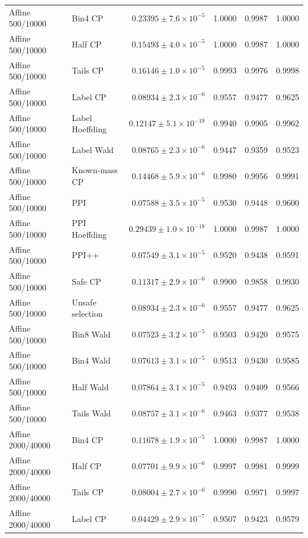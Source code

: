 \begin{longtable}{llrrrr}
Affine 500/10000 & Bin4 CP & $0.23395\pm 7.6\times 10^{-5}$ & 1.0000 & 0.9987 & 1.0000 \\
Affine 500/10000 & Half CP & $0.15493\pm 4.0\times 10^{-5}$ & 1.0000 & 0.9987 & 1.0000 \\
Affine 500/10000 & Tails CP & $0.16146\pm 1.0\times 10^{-5}$ & 0.9993 & 0.9976 & 0.9998 \\
Affine 500/10000 & Label CP & $0.08934\pm 2.3\times 10^{-6}$ & 0.9557 & 0.9477 & 0.9625 \\
Affine 500/10000 & Label Hoeffding & $0.12147\pm 5.1\times 10^{-19}$ & 0.9940 & 0.9905 & 0.9962 \\
Affine 500/10000 & Label Wald & $0.08765\pm 2.3\times 10^{-6}$ & 0.9447 & 0.9359 & 0.9523 \\
Affine 500/10000 & Known-mass CP & $0.14468\pm 5.9\times 10^{-6}$ & 0.9980 & 0.9956 & 0.9991 \\
Affine 500/10000 & PPI & $0.07588\pm 3.5\times 10^{-5}$ & 0.9530 & 0.9448 & 0.9600 \\
Affine 500/10000 & PPI Hoeffding & $0.29439\pm 1.0\times 10^{-18}$ & 1.0000 & 0.9987 & 1.0000 \\
Affine 500/10000 & PPI++ & $0.07549\pm 3.1\times 10^{-5}$ & 0.9520 & 0.9438 & 0.9591 \\
Affine 500/10000 & Safe CP & $0.11317\pm 2.9\times 10^{-6}$ & 0.9900 & 0.9858 & 0.9930 \\
Affine 500/10000 & Unsafe selection & $0.08934\pm 2.3\times 10^{-6}$ & 0.9557 & 0.9477 & 0.9625 \\
Affine 500/10000 & Bin8 Wald & $0.07523\pm 3.2\times 10^{-5}$ & 0.9503 & 0.9420 & 0.9575 \\
Affine 500/10000 & Bin4 Wald & $0.07613\pm 3.1\times 10^{-5}$ & 0.9513 & 0.9430 & 0.9585 \\
Affine 500/10000 & Half Wald & $0.07864\pm 3.1\times 10^{-5}$ & 0.9493 & 0.9409 & 0.9566 \\
Affine 500/10000 & Tails Wald & $0.08757\pm 3.1\times 10^{-6}$ & 0.9463 & 0.9377 & 0.9538 \\
Affine 2000/40000 & Bin4 CP & $0.11678\pm 1.9\times 10^{-5}$ & 1.0000 & 0.9987 & 1.0000 \\
Affine 2000/40000 & Half CP & $0.07701\pm 9.9\times 10^{-6}$ & 0.9997 & 0.9981 & 0.9999 \\
Affine 2000/40000 & Tails CP & $0.08004\pm 2.7\times 10^{-6}$ & 0.9990 & 0.9971 & 0.9997 \\
Affine 2000/40000 & Label CP & $0.04429\pm 2.9\times 10^{-7}$ & 0.9507 & 0.9423 & 0.9579 \\

\end{longtable}
